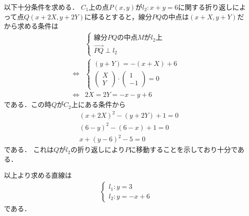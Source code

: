 \documentclass[../../main.tex]{subfiles}
\begin{document}
以下十分条件を求める．
$C_1$上の点$P(x, y)$が$l_2: x+y=6$に関する折り返しによって点$Q(x+2X, y+2Y)$に移るとすると，線分$PQ$の中点は$(x+X,y+Y)$だから求める条件は
\begin{align}
  &
  \begin{cases}
    \text{線分$PQ$の中点$M$が$l_2$上} \\
    \overrightarrow{PQ} \perp l_2
  \end{cases} \\
  \iff
  &
  \begin{cases}
    (y+Y) = -(x+X)+6 \\
    \begin{pmatrix} X \\ Y
    \end{pmatrix}\cdot
    \begin{pmatrix} 1 \\ -1
    \end{pmatrix} = 0
  \end{cases} \\
  \iff
  & 2X = 2Y = -x-y+6
\end{align}
である．この時$Q$が$C_2$上にある条件から
\begin{align}
  & (x+2X)^2-(y+2Y) + 1 = 0 \\
  & (6-y)^2 - (6-x) + 1 = 0 \\
  & x + (y-6)^2 - 5 = 0
\end{align}
である．
これは$Q$が$l_2$の折り返しにより$P$に移動することを示しており十分である．

以上より求める直線は
\begin{align}
  \begin{cases}
    l_1: y = 3 \\
    l_2: y = -x+6
  \end{cases} \tag{答}
\end{align}
である．

\newpage
\end{document}
